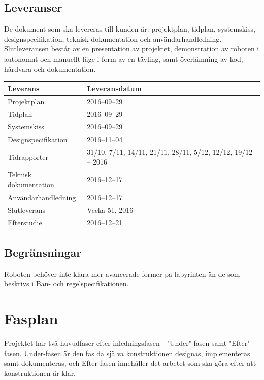 \documentclass[a4paper,titlepage,12pt]{article}
\begin{document}
	
	\subsection{Leveranser}
	De dokument som ska levereras till kunden är: projektplan, tidplan,
	systemskiss, designspecifikation, teknisk dokumentation och
	användarhandledning. Slutleveransen består av en presentation av projektet,
	demonstration av roboten i autonomnt och manuellt läge i form av en tävling,
	samt överlämning av kod, hårdvara och dokumentation.

	\begin{longtable}[l]{l l}
		\textbf{Leverans} & \textbf{Leveransdatum} \\ \midrule
		
		Projektplan & 2016--09--29 \\ \midrule

		Tidplan & 2016--09--29  \\ \midrule
		
		Systemskiss & 2016--09--29 \\ \midrule

		Designspecifikation & 2016--11--04 \\ \midrule

		Tidrapporter & 31/10, 7/11, 14/11, 21/11, 28/11, 5/12, 12/12, 19/12
                   -- 2016		\\ \midrule

		Teknisk dokumentation & 2016--12--17 \\ \midrule

		Användarhandledning & 2016--12--17 \\ \midrule

        Slutleverans & Vecka 51, 2016 \\ \midrule

		Efterstudie & 2016--12--21  \\ \midrule
	\end{longtable}
	
	
	\subsection{Begränsningar}
	Roboten behöver inte klara mer avancerade former på labyrinten än de som
	beskrivs i Ban- och regelspecifikationen.
	
	
	\section{Fasplan}
    Projektet har två huvudfaser efter inledningsfasen - "Under"-fasen samt
    "Efter"-fasen. Under-fasen är den fas då själva konstruktionen designas, 
    implementeras samt dokumenteras, och Efter-fasen innehåller det arbetet som
    ska göra efter att konstruktionen är klar.
	
\end{document}
